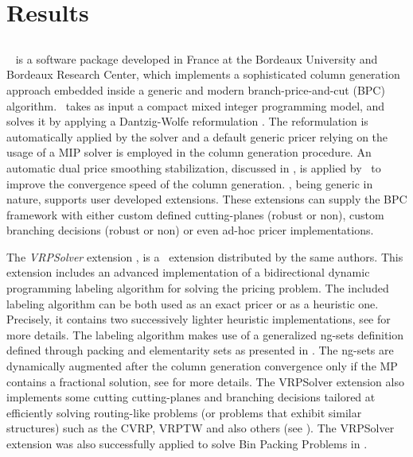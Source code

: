 \chapter{Results}
\label{sec:results}

\section{\bapcod}
\label{sec:results-bapcod}

\textit{\bapcod}\ \parencite{sadykov2021} is a software package
developed in France at the Bordeaux University and Bordeaux Research Center,
which implements a sophisticated column generation approach
embedded inside a generic and modern branch-price-and-cut (BPC) algorithm.
\bapcod\ takes as input a compact mixed integer programming model,
and solves it by applying a Dantzig-Wolfe reformulation \parencite{dantzig1960}.
The reformulation is automatically applied by the solver
and a default generic pricer relying on
the usage of a MIP solver is employed in the column generation procedure.
An automatic dual price smoothing stabilization, discussed in \textcite{pessoa2018automation},
is applied by \bapcod\ to improve the convergence speed of the column generation.
\bapcod, being generic in nature,
supports user developed extensions.
These extensions can supply the BPC framework with either
custom defined cutting-planes (robust or non), custom branching decisions (robust or non)
or even ad-hoc pricer implementations.

The \textit{VRPSolver} extension \parencite{pessoa2020a}, is
a \bapcod\ extension distributed by the same authors.
This extension includes an
advanced implementation of a bidirectional dynamic programming labeling algorithm
\parencite{sadykov2021a} for solving the pricing problem.
The included labeling algorithm
can be both used as an exact pricer or as a heuristic one.
Precisely, it contains two successively lighter heuristic implementations, see \textcite{sadykov2021a} for more details.
The labeling algorithm makes use of a generalized ng-sets definition \parencite{baldacci2011}
defined through packing and elementarity sets as presented in \textcite{pessoa2020a}.
The ng-sets are dynamically augmented \parencite{roberti2014}
after the column generation convergence only if the MP contains a fractional solution,
see \textcite{pessoa2020a} for more details.
The VRPSolver extension also implements
some cutting cutting-planes and branching decisions
tailored at efficiently solving routing-like problems
(or problems that exhibit similar structures)
such as the CVRP, VRPTW and also others (see \cite{pessoa2020a}).
The VRPSolver extension was also successfully applied
to solve Bin Packing Problems in \textcite{pessoa2020}.

